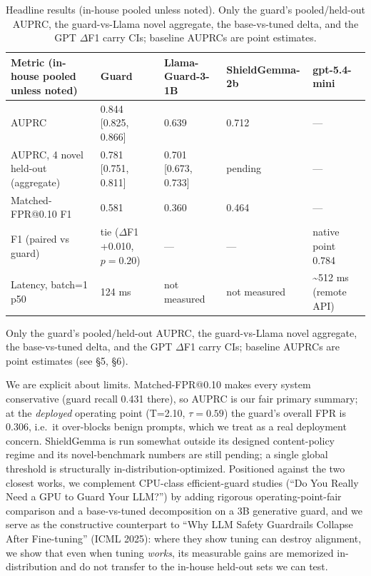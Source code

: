 \documentclass[sigconf,nonacm]{acmart}
\begin{document}
\begin{table}[t]
  \centering
  \small
  \caption{Headline results (in-house pooled unless noted). Only the guard's pooled/held-out AUPRC, the guard-vs-Llama novel aggregate, the base-vs-tuned delta, and the GPT $\Delta$F1 carry CIs; baseline AUPRCs are point estimates.}
  \label{tab:headline}
  \begin{tabular}{lllll}
    \toprule
    Metric (in-house pooled unless noted) & Guard & Llama-Guard-3-1B & ShieldGemma-2b & gpt-5.4-mini \\
    \midrule
    AUPRC & 0.844 [0.825, 0.866] & 0.639 & 0.712 & --- \\
    AUPRC, 4 novel held-out (aggregate) & 0.781 [0.751, 0.811] & 0.701 [0.673, 0.733] & pending & --- \\
    Matched-FPR@0.10 F1 & 0.581 & 0.360 & 0.464 & --- \\
    F1 (paired vs guard) & tie ($\Delta$F1 +0.010, $p=0.20$) & --- & --- & native point 0.784 \\
    Latency, batch=1 p50 & 124 ms & not measured & not measured & \textasciitilde{}512 ms (remote API) \\
    \bottomrule
  \end{tabular}
\end{table}

Only the guard's pooled/held-out AUPRC, the guard-vs-Llama novel aggregate, the base-vs-tuned delta, and the GPT $\Delta$F1 carry CIs; baseline AUPRCs are point estimates (see \S5, \S6).

We are explicit about limits. Matched-FPR@0.10 makes every system conservative (guard recall 0.431 there), so AUPRC is our fair primary summary; at the \emph{deployed} operating point (T=2.10, $\tau=0.59$) the guard's overall FPR is 0.306, i.e.\ it over-blocks benign prompts, which we treat as a real deployment concern. ShieldGemma is run somewhat outside its designed content-policy regime and its novel-benchmark numbers are still pending; a single global threshold is structurally in-distribution-optimized. Positioned against the two closest works, we complement CPU-class efficient-guard studies (``Do You Really Need a GPU to Guard Your LLM?'') by adding rigorous operating-point-fair comparison and a base-vs-tuned decomposition on a 3B generative guard, and we serve as the constructive counterpart to ``Why LLM Safety Guardrails Collapse After Fine-tuning'' (ICML 2025): where they show tuning can destroy alignment, we show that even when tuning \emph{works}, its measurable gains are memorized in-distribution and do not transfer to the in-house held-out sets we can test.
\end{document}
